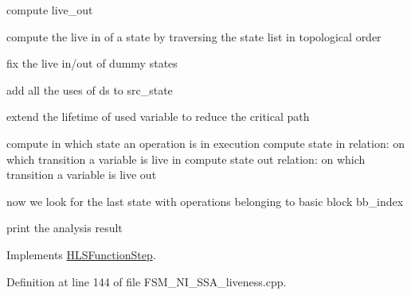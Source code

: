 compute live\+\_\+out

compute the live in of a state by traversing the state list in topological order

fix the live in/out of dummy states

add all the uses of ds to src\+\_\+state

extend the lifetime of used variable to reduce the critical path

compute in which state an operation is in execution compute state in relation\+: on which transition a variable is live in compute state out relation\+: on which transition a variable is live out

now we look for the last state with operations belonging to basic block bb\+\_\+index

print the analysis result 

Implements \hyperlink{classHLSFunctionStep_a8db4c00d080655984d98143206fc9fa8}{H\+L\+S\+Function\+Step}.



Definition at line 144 of file F\+S\+M\+\_\+\+N\+I\+\_\+\+S\+S\+A\+\_\+liveness.\+cpp.



